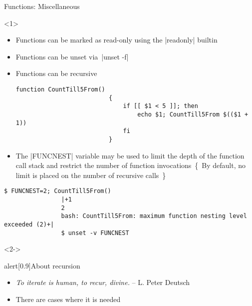 \begin{frame}[fragile]{Functions: Miscellaneous}
    \begin{overlayarea}{\textwidth}{0.7\textheight}
        \begin{onlyenv}<1>
            \vspace{-3mm}
            \begin{itemize}
                \item Functions can be marked as read-only using the \bash|readonly| builtin
                \item Functions can be unset via \,\bash|unset -f|
                \item Functions can be recursive
                      \begin{lstlisting}[style=MyBash, xrightmargin=12mm, aboveskip=2mm, belowskip=-6mm]
                          function CountTill5From()
                          {
                              if [[ $1 < 5 ]]; then
                                  echo $1; CountTill5From $(($1 + 1))
                              fi
                          }
                      \end{lstlisting}
                \item The \bash|FUNCNEST| variable may be used to limit the depth of the function call stack and restrict the number of function invocations
                      \,{\tiny\{~By default, no limit is placed on the number of recursive calls~\}}
            \end{itemize}
            \begin{lstlisting}[style=MyBash, xrightmargin=-2mm, xleftmargin=2mm, aboveskip=0mm, numbers=none]
                $ FUNCNEST=2; CountTill5From()
                |+1
                2
                bash: CountTill5From: maximum function nesting level exceeded (2)+|
                $ unset -v FUNCNEST
            \end{lstlisting}
        \end{onlyenv}
        \begin{onlyenv}<2->
            \vspace{-9mm}
            \begin{varblock}{alert}[0.9\textwidth]{About recursion}
                \begin{itemize}
                    \item \emph{\guillemotleft To iterate is human, to recur, divine.\guillemotright} -- L. Peter Deutsch
                    \item There are cases where it is needed

\end{itemize}
\end{varblock}
\end{onlyenv}
\end{overlayarea}
\end{frame}
